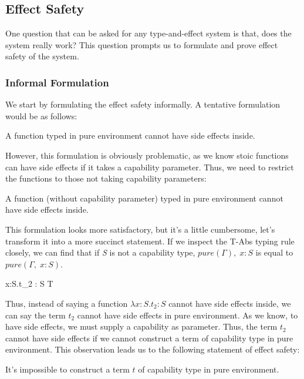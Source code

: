 \subsection{Effect Safety}

One question that can be asked for any type-and-effect system is that,
does the system really work? This question prompts us to formulate and
prove effect safety of the system.

\subsubsection{Informal Formulation}

We start by formulating the effect safety informally. A tentative
formulation would be as follows:

\begin{definition}
A function typed in pure environment cannot have side effects inside.
\end{definition}

However, this formulation is obviously problematic, as we know stoic
functions can have side effects if it takes a capability
parameter. Thus, we need to restrict the functions to those not taking
capability parameters:

\begin{definition}
  A function (without capability parameter) typed in pure environment
  cannot have side effects inside.
\end{definition}

This formulation looks more satisfactory, but it's a little
cumbersome, let's transform it into a more succinct statement. If we
inspect the T-Abs typing rule closely, we can find that if \emph{S} is
not a capability type, $pure(\Gamma),\; x: S$ is equal to
$pure(\Gamma,\; x: S)$.

{ \Gamma \vdash \lambda x:S.\;t_2 : S \to T }

Thus, instead of saying a function $\lambda x:S.t_2 : S$ cannot have
side effects inside, we can say the term $t_2$ cannot have side
effects in pure environment. As we know, to have side effects, we must
supply a capability as parameter. Thus, the term $t_2$ cannot have
side effects if we cannot construct a term of capability type in pure
environment. This observation leads us to the following statement of
effect safety:

\begin{definition}
 It's impossible to construct a term $t$ of capability type in pure environment.
\end{definition}

